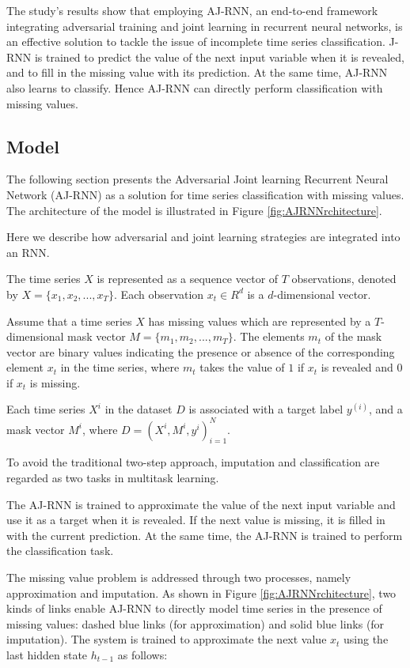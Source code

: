 The study's results show that employing AJ-RNN, an end-to-end framework integrating adversarial training and joint learning in recurrent neural networks, is an effective solution to tackle the issue of incomplete time series classification.
J-RNN is trained to predict the value of the next input variable when it is revealed, and to fill in the missing value with its prediction.
At the same time, AJ-RNN also learns to classify.
Hence AJ-RNN can directly perform classification with missing values.

\subsection{Model}


The following section presents the Adversarial Joint learning Recurrent Neural Network (AJ-RNN) as a solution for time series classification with missing values. 
The architecture of the model is illustrated in Figure \ref{fig:AJRNNrchitecture}. 

Here we describe how adversarial and joint learning strategies are integrated into an RNN.


The time series $X$ is represented as a sequence vector of $T$ observations, denoted by $X = \{x_1, x_2, ..., x_T \}$. Each observation $x_t \in R^d$ is a $d$-dimensional vector.

Assume that a time series $X$ has missing values which are represented by a $T$-dimensional mask vector $M = \{m_1, m_2, ..., m_T\}$.
The elements $m_t$ of the mask vector are binary values indicating the presence or absence of the corresponding element $x_t$ in the time series, where $m_t$ takes the value of $1$ if $x_t$ is revealed and $0$ if $x_t$ is missing.

Each time series $X^i$ in the dataset $D$ is associated with a target label $y^{(i)}$, and a mask vector $M^i$, where $D = {(X^i,M^i, y^i)}^N_{i=1}$.

To avoid the traditional two-step approach, imputation and classification are regarded as two tasks in multitask learning.

The AJ-RNN is trained to approximate the value of the next input variable and use it as a target when it is revealed.
If the next value is missing, it is filled in with the current prediction.
At the same time, the AJ-RNN is trained to perform the classification task.

The missing value problem is addressed through two processes, namely approximation and imputation.
As shown in Figure \ref{fig:AJRNNrchitecture}, two kinds of links enable AJ-RNN to directly model time series in the presence of missing values: dashed blue links (for approximation) and solid blue links (for imputation). 
The system is trained to approximate the next value $x_t$ using the last hidden state $h_{t-1}$ as follows:

